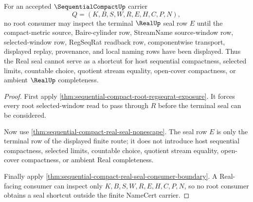 \begin{theorem}
\label{thm:sequential-compact-root-realseal-refusal}
For an accepted $\SequentialCompactUp$ carrier
$$
Q=(K,B,S,W,R,E,H,C,P,N),
$$
no root consumer may inspect the terminal $\RealUp$ seal row $E$ until the compact-metric source, Baire-cylinder row, StreamName source-window row, selected-window row, RegSeqRat readback row, componentwise transport, displayed replay, provenance, and local naming rows have been displayed. Thus the Real seal cannot serve as a shortcut for host sequential compactness, selected limits, countable choice, quotient stream equality, open-cover compactness, or ambient $\RealUp$ completeness.
\end{theorem}
\begin{proof}
First apply \autoref{thm:sequential-compact-root-regseqrat-exposure}. It forces every root selected-window read to pass through $R$ before the terminal seal can be considered.

Now use \autoref{thm:sequential-compact-real-seal-nonescape}. The seal row $E$ is only the terminal row of the displayed finite route; it does not introduce host sequential compactness, selected limits, countable choice, quotient stream equality, open-cover compactness, or ambient Real completeness.

Finally apply \autoref{thm:sequential-compact-real-seal-consumer-boundary}. A Real-facing consumer can inspect only $K,B,S,W,R,E,H,C,P,N$, so no root consumer obtains a seal shortcut outside the finite NameCert carrier.
\end{proof}

